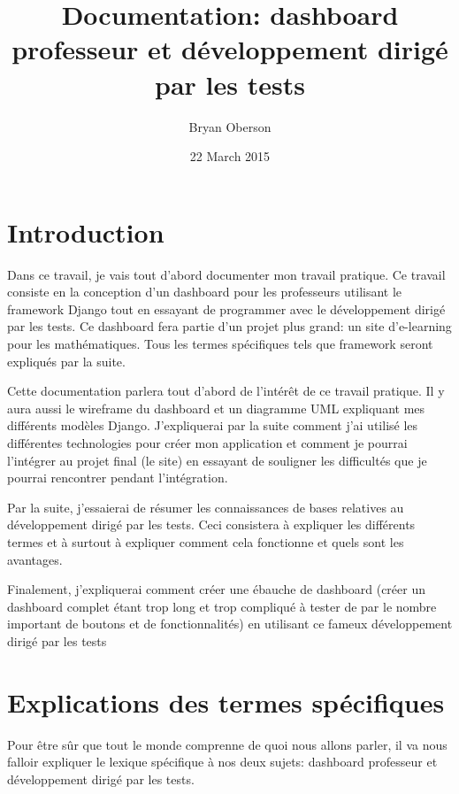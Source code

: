 \documentclass[letterpaper,10pt,french]{sphinxmanual}
\title{Documentation: dashboard professeur et développement dirigé par les tests}
\date{22 March 2015}
\author{Bryan Oberson}
\begin{document}
\maketitle
\tableofcontents
{}\label{index::doc}



\chapter{Introduction}
\label{introduction:introduction}\label{introduction:conception-du-dashboard-professeur-a-laide-du-developpement-dirige-par-les-tests}\label{introduction::doc}
Dans ce travail, je vais tout d'abord documenter mon travail pratique. Ce
travail consiste en la conception d'un dashboard pour les professeurs
utilisant le framework Django tout en essayant de programmer
avec le développement dirigé par les tests.
Ce dashboard fera partie d'un projet plus grand: un site d'e-learning pour les
mathématiques.
Tous les termes spécifiques tels que framework seront expliqués par la suite.

Cette documentation parlera tout d'abord de l'intérêt de ce travail pratique.
Il y aura aussi le wireframe du dashboard et un diagramme UML expliquant mes
différents modèles Django. J'expliquerai par la suite comment j'ai utilisé
les différentes technologies pour créer mon application et comment
je pourrai l'intégrer au projet final (le site) en essayant de souligner les
difficultés que je pourrai rencontrer pendant l'intégration.

Par la suite, j'essaierai de résumer les connaissances de bases relatives
au développement dirigé par les tests. Ceci consistera à expliquer les
différents termes et à surtout à expliquer comment cela fonctionne et quels
sont les avantages.

Finalement, j'expliquerai comment créer une ébauche de dashboard (créer un
dashboard complet étant trop long et trop compliqué à tester de par le nombre
important de boutons et de fonctionnalités) en utilisant ce fameux
développement dirigé par les tests


\chapter{Explications des termes spécifiques}
\label{introduction:explications-des-termes-specifiques}
Pour être sûr que tout le monde comprenne de quoi nous allons parler,
il va nous falloir expliquer le lexique spécifique à nos deux sujets:
dashboard professeur et développement dirigé par les tests.
\end{document}
